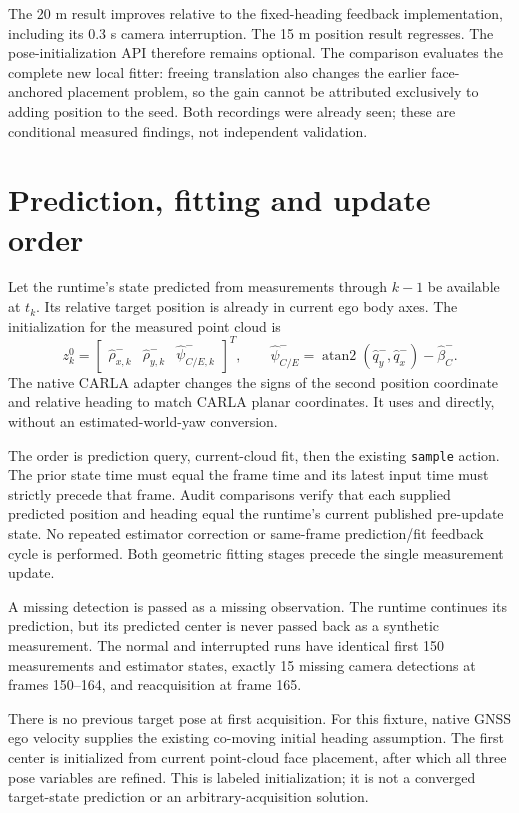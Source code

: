 \documentclass[11pt]{article}
\begin{document}
The 20 m result improves relative to the fixed-heading feedback implementation,
including its 0.3 s camera interruption. The 15 m position result regresses.
The pose-initialization API therefore remains optional. The comparison evaluates
the complete new local fitter: freeing translation also changes the earlier
face-anchored placement problem, so the gain cannot be attributed exclusively
to adding position to the seed. Both recordings were already seen; these are
conditional measured findings, not independent validation.

\section{Prediction, fitting and update order}
Let the runtime's state predicted from measurements through $k-1$ be available
at $t_k$. Its relative target position is already in current ego body axes.
The initialization for the measured point cloud is
\[
 z_k^0=\begin{bmatrix}\hat\rho_{x,k}^{-}&\hat\rho_{y,k}^{-}&
 \hat\psi_{C/E,k}^{-}\end{bmatrix}^{\!T},\qquad
 \hat\psi_{C/E}^{-}=\operatorname{atan2}(\hat q_y^{-},\hat q_x^{-})-\hat\beta_C^{-}.
\]
The native CARLA adapter changes the signs of the second position coordinate
and relative heading to match CARLA planar coordinates. It uses
 and 
directly, without an estimated-world-yaw conversion.

The order is prediction query, current-cloud fit, then the existing
 \texttt{sample} action. The prior state time
must equal the frame time and its latest input time must strictly precede that
frame. Audit comparisons verify that each supplied predicted position and
heading equal the runtime's current published pre-update state. No repeated
estimator correction or same-frame prediction/fit feedback cycle is performed.
Both geometric fitting stages precede the single measurement update.

A missing detection is passed as a missing observation. The runtime continues
its prediction, but its predicted center is never passed back as a synthetic
measurement. The normal and interrupted runs have identical first 150
measurements and estimator states, exactly 15 missing camera detections at
frames 150--164, and reacquisition at frame 165.

There is no previous target pose at first acquisition. For this fixture, native
GNSS ego velocity supplies the existing co-moving initial heading assumption.
The first center is initialized from current point-cloud face placement, after
which all three pose variables are refined. This is labeled initialization;
it is not a converged target-state prediction or an arbitrary-acquisition solution.
\end{document}
